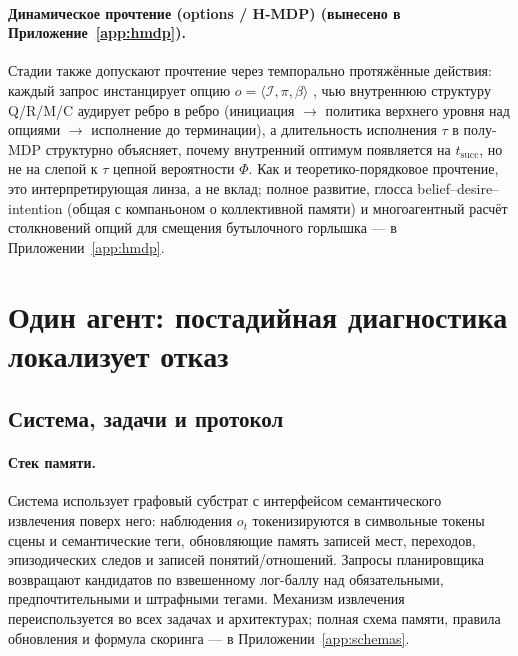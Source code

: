 \documentclass{article}
\begin{document}
\paragraph{Динамическое прочтение (options / H-MDP) (вынесено в Приложение~\ref{app:hmdp}).}
Стадии также допускают прочтение через темпорально протяжённые действия: каждый запрос инстанцирует опцию $o=\langle\mathcal{I},\pi,\beta\rangle$ \citep{sutton1999between}, чью внутреннюю структуру Q/R/M/C аудирует ребро в ребро (инициация $\to$ политика верхнего уровня над опциями $\to$ исполнение до терминации), а длительность исполнения $\tau$ в полу-MDP структурно объясняет, почему внутренний оптимум появляется на $t_{\mathrm{succ}}$, но не на слепой к $\tau$ цепной вероятности $\Phi$. Как и теоретико-порядковое прочтение, это интерпретирующая линза, а не вклад; полное развитие, глосса belief--desire--intention (общая с компаньоном о коллективной памяти) и многоагентный расчёт столкновений опций для смещения бутылочного горлышка --- в Приложении~\ref{app:hmdp}.

\section{Один агент: постадийная диагностика локализует отказ}
\label{sec:single}

\subsection{Система, задачи и протокол}
\label{sec:single-setup}

\paragraph{Стек памяти.}
Система использует графовый субстрат с интерфейсом семантического извлечения поверх него: наблюдения $o_t$ токенизируются в символьные токены сцены и семантические теги, обновляющие память записей мест, переходов, эпизодических следов и записей понятий/отношений. Запросы планировщика возвращают кандидатов по взвешенному лог-баллу над обязательными, предпочтительными и штрафными тегами. Механизм извлечения переиспользуется во всех задачах и архитектурах; полная схема памяти, правила обновления и формула скоринга --- в Приложении~\ref{app:schemas}.
\end{document}
